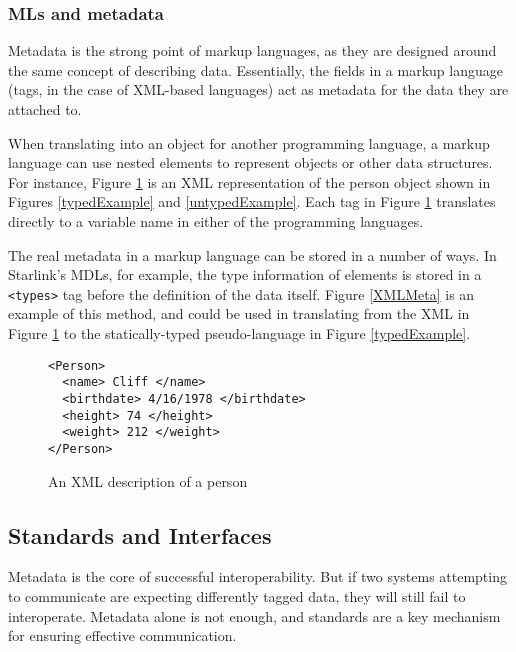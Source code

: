 \documentclass{sig-alternate}
\begin{document}
\subsubsection*{MLs and metadata}
Metadata is the strong point of markup languages, as they are designed around the same concept of describing data. Essentially, the fields in a markup language (tags, in the case of XML-based languages) act as metadata for the data they are attached to.

When translating into an object for another programming language, a markup language can use nested elements to represent objects or other data structures. For instance, Figure \ref{XMLexample} is an XML representation of the person object shown in Figures \ref{typedExample} and \ref{untypedExample}. Each tag in Figure \ref{XMLexample} translates directly to a variable name in either of the programming languages.

The real metadata in a markup language can be stored in a number of ways. In Starlink's MDLs, for example, the type information of elements is stored in a {\tt <types>} tag before the definition of the data itself. Figure \ref{XMLMeta} is an example of this method, and could be used in translating from the XML in Figure \ref{XMLexample} to the statically-typed pseudo-language in Figure \ref{typedExample}.

\begin{figure}
\begin{verbatim}
<Person>
  <name> Cliff </name>
  <birthdate> 4/16/1978 </birthdate>
  <height> 74 </height>
  <weight> 212 </weight>
</Person>
\end{verbatim}
\caption{An XML description of a person}
\label{XMLexample}
\end{figure}



\subsection{Standards and Interfaces}\label{standards}
Metadata is the core of successful interoperability. But if two systems attempting to communicate are expecting differently tagged data, they will still fail to interoperate. Metadata alone is not enough, and standards are a key mechanism for ensuring effective communication.
\end{document}

